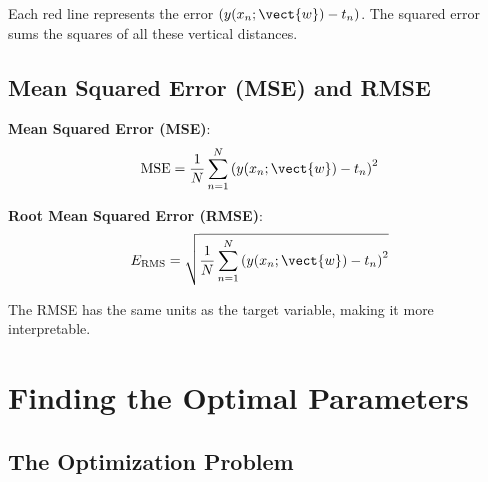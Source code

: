 \begin{center}
\end{center}

Each red line represents the error $(y(x_n; \vect{w}) - t_n)$. The squared error sums the squares of all these vertical distances.

\subsection{Mean Squared Error (MSE) and RMSE}

\begin{definitionbox}
\textbf{Mean Squared Error (MSE)}:
\[
\text{MSE} = \frac{1}{N} \sum_{n=1}^{N} \left( y(x_n; \vect{w}) - t_n \right)^2
\]

\textbf{Root Mean Squared Error (RMSE)}:
\[
E_{\text{RMS}} = \sqrt{\frac{1}{N} \sum_{n=1}^{N} \left( y(x_n; \vect{w}) - t_n \right)^2}
\]
\end{definitionbox}

The RMSE has the same units as the target variable, making it more interpretable.


\section{Finding the Optimal Parameters}

\subsection{The Optimization Problem}

